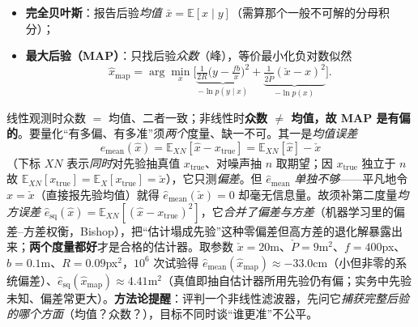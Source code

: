 \begin{itemize}
  \item \textbf{完全贝叶斯}：报告后验\emph{均值} $\bar{x}=\mathbb{E}[x\mid y]$（需算那个一般不可解的分母积分）；
  \item \textbf{最大后验（MAP）}：只找后验\emph{众数}（峰），等价最小化负对数似然
  \begin{equation}
    \hat{x}_{\text{map}}=\arg\min_x\Big[\underbrace{\tfrac{1}{2R}\big(y-\tfrac{fb}{x}\big)^2}_{-\ln p(y\mid x)}+\underbrace{\tfrac{1}{2\check{P}}(\check{x}-x)^2}_{-\ln p(x)}\Big].
    \label{eq:stereo-map}
  \end{equation}
\end{itemize}
线性观测时众数 $=$ 均值、二者一致；非线性时\textbf{众数 $\ne$ 均值，故 MAP 是有偏的}。要量化“有多偏、有多准”须\emph{两个}度量、缺一不可\cite{barfoot2024state}。其一是\emph{均值误差}
\begin{equation}
  \hat{e}_{\text{mean}}(\hat{x})=\mathbb{E}_{XN}[\hat{x}-x_{\text{true}}]=\mathbb{E}_{XN}[\hat{x}]-\check{x}
  \label{eq:e-sq-def}
\end{equation}
（下标 $XN$ 表示\emph{同时}对先验抽真值 $x_{\text{true}}$、对噪声抽 $n$ 取期望；因 $x_{\text{true}}$ 独立于 $n$ 故 $\mathbb{E}_{XN}[x_{\text{true}}]=\mathbb{E}_X[x_{\text{true}}]=\check{x}$），它只测\emph{偏差}。但 $\hat{e}_{\text{mean}}$ \emph{单独不够}——平凡地令 $\hat{x}=\check{x}$（直接报先验均值）就得 $\hat{e}_{\text{mean}}(\check{x})=0$ 却毫无信息量。故须补第二度量\emph{均方误差} $\hat{e}_{\text{sq}}(\hat{x})=\mathbb{E}_{XN}[(\hat{x}-x_{\text{true}})^2]$，它\emph{合并了偏差与方差}（机器学习里的偏差–方差权衡，Bishop），把“估计塌成先验”这种零偏差但高方差的退化解暴露出来；\textbf{两个度量都好}才是合格的估计器。取参数 $\check{x}=20$m、$\check{P}=9$m$^2$、$f=400$px、$b=0.1$m、$R=0.09$px$^2$，$10^6$ 次试验得 $\hat{e}_{\text{mean}}(\hat{x}_{\text{map}})\approx-33.0$cm（小但非零的系统偏差）、$\hat{e}_{\text{sq}}(\hat{x}_{\text{map}})\approx4.41$m$^2$\cite{barfoot2024state}（真值即抽自估计器所用先验仍有偏；实务中先验未知、偏差常更大）。\textbf{方法论提醒}：评判一个非线性滤波器，先问它\emph{捕获完整后验的哪个方面}（均值？众数？），目标不同时谈“谁更准”不公平。

